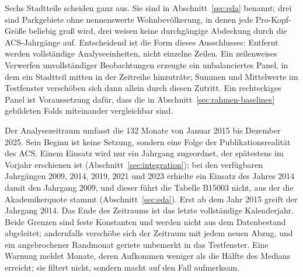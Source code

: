 Sechs Stadtteile scheiden ganz aus. Sie sind in Abschnitt~\ref{sec:eda}
benannt; drei sind Parkgebiete ohne nennenswerte Wohnbevölkerung, in denen jede
Pro-Kopf-Größe beliebig groß wird, drei weisen keine durchgängige Abdeckung
durch die ACS-Jahrgänge auf. Entscheidend ist die Form dieses Ausschlusses:
Entfernt werden vollständige Analyseeinheiten, nicht einzelne Zeilen. Ein
zeilenweises Verwerfen unvollständiger Beobachtungen erzeugte ein
unbalanciertes Panel, in dem ein Stadtteil mitten in der Zeitreihe hinzuträte;
Summen und Mittelwerte im Testfenster verschöben sich dann allein durch diesen
Zutritt. Ein rechteckiges Panel ist Voraussetzung dafür, dass die in
Abschnitt~\ref{sec:rahmen-baselines} gebildeten Folds miteinander vergleichbar
sind.

Der Analysezeitraum umfasst die 132 Monate von Januar 2015 bis Dezember 2025.
Sein Beginn ist keine Setzung, sondern eine Folge der Publikationsrealität des
ACS. Einem Einsatz wird nur ein Jahrgang zugeordnet, der spätestens im Vorjahr
erschienen ist (Abschnitt~\ref{sec:integration}); bei den verfügbaren Jahrgängen
2009, 2014, 2019, 2021 und 2023 erhielte ein Einsatz des Jahres 2014 damit den
Jahrgang 2009, und dieser führt die Tabelle B15003 nicht, aus der die
Akademikerquote stammt (Abschnitt~\ref{sec:eda}). Erst ab dem Jahr 2015 greift
der Jahrgang 2014. Das Ende des Zeitraums ist das letzte vollständige
Kalenderjahr. Beide Grenzen sind feste Konstanten und werden nicht aus dem
Datenbestand abgeleitet; andernfalls verschöbe sich der Zeitraum mit jedem
neuen Abzug, und ein angebrochener Randmonat geriete unbemerkt in das
Testfenster. Eine Warnung meldet Monate, deren Aufkommen weniger als die Hälfte
des Medians erreicht; sie filtert nicht, sondern macht auf den Fall aufmerksam.

